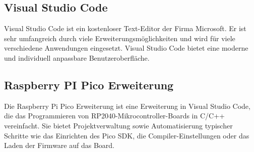 \begin{inhalt}
\subsection{Visual Studio Code} \label{sec:VS-Code}

Visual Studio Code ist ein kostenloser Text-Editor der Firma Microsoft. Er ist sehr umfangreich durch viele Erweiterungsmöglichkeiten und wird für viele verschiedene Anwendungen eingesetzt. Visual Studio Code bietet eine moderne und individuell anpassbare Benutzeroberfläche. \cite{VisualStudioCode}

\subsection{Raspberry PI Pico Erweiterung} \label{sec:PicoExtension}

Die Raspberry Pi Pico Erweiterung ist eine Erweiterung in Visual Studio Code, die das Programmieren von RP2040-Mikrocontroller-Boards in C/C++ vereinfacht. Sie bietet Projektverwaltung sowie Automatisierung typischer Schritte wie das Einrichten des Pico SDK, die Compiler-Einstellungen oder das Laden der Firmware auf das Board. \cite{Raspberry_Pi_Pico_Erweiterung}


\end{inhalt}
